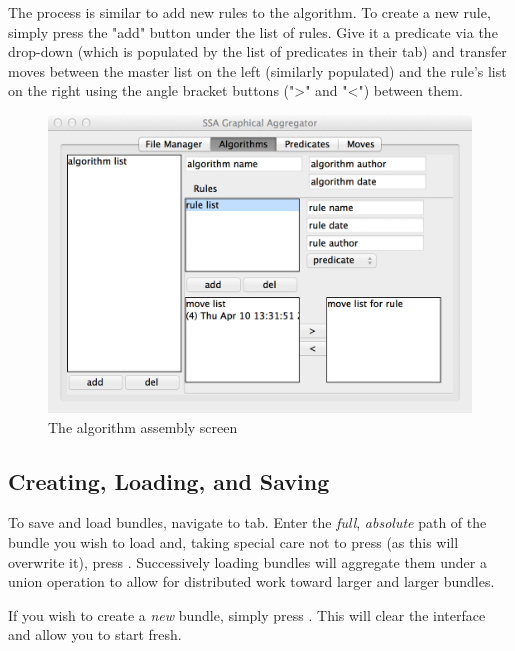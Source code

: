 The process is similar to add new rules to the algorithm.
To create a new rule, simply press the "add" button under the list of rules.
Give it a predicate via the drop-down (which is populated by the list of predicates in their tab)
  and transfer moves between the master list on the left (similarly populated) and the rule's list on the right
  using the angle bracket buttons (">" and "<") between them.
\begin{figure}
  \centering
  \includegraphics[width=\textwidth]{algorithms}
  \caption{The algorithm assembly screen}
  \label{fig:iface:alg-asm}
\end{figure}

\subsection{Creating, Loading, and Saving}
\label{sec:iface:saving}

To save and load bundles, navigate to  tab.
Enter the \emph{full}, \emph{absolute} path of the bundle you wish to load and,
  taking special care not to press 
  (as this will overwrite it),
  press .
Successively loading bundles will aggregate them under a union operation
  to allow for distributed work toward larger and larger bundles.

If you wish to create a \emph{new} bundle, simply press .
This will clear the interface and allow you to start fresh.

